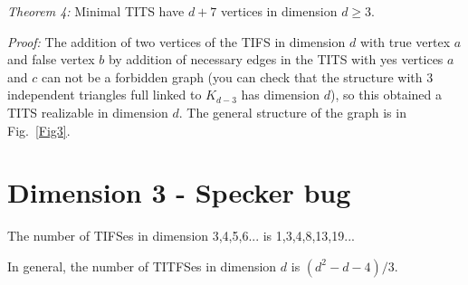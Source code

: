 \documentclass[%
  twocolumn,
 showpacs,
 showkeys,
 preprintnumbers,
 amsmath,amssymb,
 aps,
  pra,
  longbibliography,
 floatfix,
 ]{revtex4-1}
\def\endproof{ }
\begin{document}
{\em Theorem 4:} Minimal TITS have $d+7$ vertices in dimension $d\geq 3$.

{\em Proof:} The addition of two vertices of the TIFS in dimension $d$ with true vertex $a$ and false vertex $b$ by addition of necessary edges in the TITS with yes vertices $a$ and $c$ can not be a forbidden graph (you can check that the structure with 3 independent triangles full linked to $K_{d-3}$ has dimension $d$), so this obtained a TITS realizable in dimension $d$. The general structure of the graph is in Fig.~\ref{Fig3}. \endproof


\section{Dimension 3 - Specker bug}

The number of TIFSes in dimension 3,4,5,6... is 1,3,4,8,13,19...

In general, the number of TITFSes in dimension $d$ is $(d^2-d-4)/3$.
\end{document}
